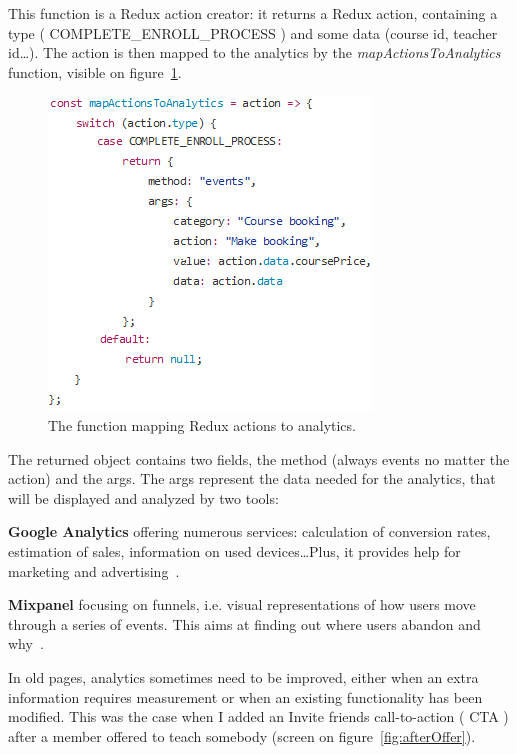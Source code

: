 This function is a Redux action creator: it returns a Redux action, containing a type (\guillemotleft{} COMPLETE\_ENROLL\_PROCESS \guillemotright{}) and some data (course id, teacher id\ldots). The action is then mapped to the analytics by the \textit{mapActionsToAnalytics} function, visible on {\sc figure}~\ref{fig:mapActions}.

\begin{figure}[H]
    \centering
    \includegraphics[scale=0.9]{figure/mapActions.png}
    \caption{The function mapping Redux actions to analytics.}
    \label{fig:mapActions}
\end{figure}

The returned object contains two fields, the method (always \guillemotleft{} events \guillemotright{} no matter the action) and the args. The args represent the data needed for the analytics, that will be displayed and analyzed by two tools: 

\textbf{Google Analytics} offering numerous services: calculation of conversion rates, estimation of sales, information on used devices\ldots Plus, it provides help for marketing and advertising~\cite{googleAnalytics}. 

\textbf{Mixpanel} focusing on funnels, i.e. visual representations of how users move through a series of events. This aims at finding out where users abandon and why~\cite{mixpanel}.

In old pages, analytics sometimes need to be improved, either when an extra information requires measurement or when an existing functionality has been modified. This was the case when I added an \guillemotleft{} Invite friends \guillemotright{} call-to-action (\guillemotleft{} CTA \guillemotright{}) after a member offered to teach somebody (screen on {\sc figure}~\ref{fig:afterOffer}).

